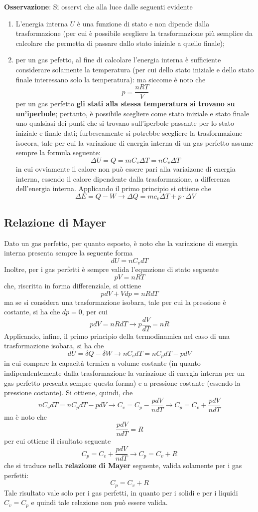 \documentclass[a4paper]{extarticle}
\begin{document}
\vspace{1em}
\noindent
\textbf{Osservazione}: Si osservi che alla luce dalle seguenti evidente
\begin{enumerate}
  \item L'energia interna $U$ è una funzione di stato e non dipende dalla trasformazione (per cui è possibile scegliere la trasformazione più semplice da calcolare che permetta di passare dallo stato iniziale a quello finale);
  \item per un gas pefetto, al fine di calcolare l'energia interna è sufficiente considerare solamente la temperatura (per cui dello stato iniziale e dello stato finale interessano solo la temperatura): ma siccome è noto che
  \[p = \frac{n R T}{V}\]
  per un gas perfetto \textbf{gli stati alla stessa temperatura si trovano su un'iperbole}; pertanto, è possibile scegliere come stato iniziale e stato finale uno qualsiasi dei punti che si trovano sull'iperbole passante per lo stato iniziale e finale dati; furbescamente si potrebbe scegliere la trasformazione isocora, tale per cui la variazione di energia interna di un gas perfetto assume sempre la formula seguente:
  \[\boxed{\Delta U = Q = m C_v \Delta T = n C_v \Delta T}\]
  in cui ovviamente il calore non può essere pari alla variaizone di energia interna, essendo il calore dipendente dalla trasformazione, a differenza dell'energia interna. Applicando il primo principio si ottiene che
  \[\Delta E = Q - W \longrightarrow \Delta Q = m c_v \Delta T + p \cdot \Delta V\]
\end{enumerate}

\vspace{1em}
\subsection{Relazione di Mayer}
Dato un gas perfetto, per quanto esposto, è noto che la variazione di energia interna presenta sempre la seguente forma
\[dU = n C_v dT\]
Inoltre, per i gas perfetti è sempre valida l'equazione di stato seguente
\[pV = n R T\]
che, riscritta in forma differenziale, si ottiene
\[p dV + V dp = n R d T\]
ma se si considera una trasformazione isobara, tale per cui la pressione è costante, si ha che $dp = 0$, per cui
\[pdV = n R dT \longrightarrow p \frac{dV}{dT} = nR\]
Applicando, infine, il primo principio della termodinamica nel caso di una trasformazione isobara, si ha che
\[dU = \delta Q - \delta W \longrightarrow n C_v dT = n C_p dT - p dV\]
in cui compare la capacità termica a volume costante (in quanto indipendentemente dalla trasformazione la variazione di energia interna per un gas perfetto presenta sempre questa forma) e a pressione costante (essendo la pressione costante). Si ottiene, quindi, che
\[n C_v dT = n C_p dT - p dV \longrightarrow C_v = C_p - \frac{p dV}{n dT} \longrightarrow C_p = C_v + \frac{p dV}{n dT}\]
ma è noto che
\[\frac{p dV}{n dT}=R\]
per cui ottiene il risultato seguente
\[C_p = C_v + \frac{p dV}{n dT} \longrightarrow C_p = C_v + R\]
che si traduce nella \textbf{relazione di Mayer} seguente, valida solamente per i gas perfetti:
\[\boxed{C_p = C_v + R}\]
Tale risultato vale solo per i gas perfetti, in quanto per i solidi e per i liquidi $C_v = C_p$ e quindi tale relazione non può essere valida.
\end{document}
